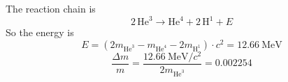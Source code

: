 The reaction chain is
\[
2\,\mathrm{He}^{3} \rightarrow \mathrm{He}^{4} + 2\,\mathrm{H}^{1} + E
\]
So the energy is
\begin{equation*}
E = \left(2m_{\mathrm{He}^{3}} - m_{\mathrm{He}^{4}} - 2m_{\mathrm{H}^{1}}\right)\cdot c^{2}
= 12.66~\mathrm{MeV} \tag*{(7 pt)}
\end{equation*}
\begin{equation*}
\frac{\Delta m}{m} = \frac{12.66~\mathrm{MeV}/c^{2}}{2m_{\mathrm{He}^{3}}} = 0.002254 \tag*{(3 pt)}
\end{equation*}
